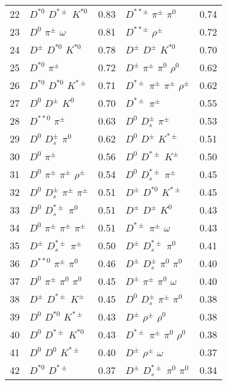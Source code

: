 \documentclass[6pt]{article}
\begin{document}
\begin{tabular}{rlr|lr}
22 & $D^{*0}$ $D^{*\pm}$ $K^{*0}$ & 0.83 & $D^{**\pm}$ $\pi^{\pm}$ $\pi^0$ & 0.74 \\
23 & $D^0$ $\pi^{\pm}$ $\omega$ & 0.81 & $D^{**\pm}$ $\rho^{\pm}$ & 0.72 \\
24 & $D^{\pm}$ $D^{*0}$ $K^{*0}$ & 0.78 & $D^{\pm}$ $D^{\pm}$ $K^{*0}$ & 0.70 \\
25 & $D^{*0}$ $\pi^{\pm}$ & 0.72 & $D^{\pm}$ $\pi^{\pm}$ $\pi^0$ $\rho^0$ & 0.62 \\
26 & $D^{*0}$ $D^{*0}$ $K^{*\pm}$ & 0.71 & $D^{*\pm}$ $\pi^{\pm}$ $\pi^{\pm}$ $\rho^{\pm}$ & 0.62 \\
27 & $D^0$ $D^{\pm}$ $K^0$ & 0.70 & $D^{*\pm}$ $\pi^{\pm}$ & 0.55 \\
28 & $D^{**0}$ $\pi^{\pm}$ & 0.63 & $D^0$ $D_s^{\pm}$ $\pi^{\pm}$ & 0.53 \\
29 & $D^0$ $D_s^{\pm}$ $\pi^0$ & 0.62 & $D^0$ $D^{\pm}$ $K^{*\pm}$ & 0.51 \\
30 & $D^0$ $\pi^{\pm}$ & 0.56 & $D^0$ $D^{*\pm}$ $K^{\pm}$ & 0.50 \\
31 & $D^0$ $\pi^{\pm}$ $\pi^{\pm}$ $\rho^{\pm}$ & 0.54 & $D^0$ $D_s^{*\pm}$ $\pi^{\pm}$ & 0.45 \\
32 & $D^0$ $D_s^{\pm}$ $\pi^{\pm}$ $\pi^{\pm}$ & 0.51 & $D^{\pm}$ $D^{*0}$ $K^{*\pm}$ & 0.45 \\
33 & $D^0$ $D_s^{*\pm}$ $\pi^0$ & 0.51 & $D^{\pm}$ $D^{\pm}$ $K^0$ & 0.43 \\
34 & $D^0$ $\pi^{\pm}$ $\pi^{\pm}$ $\pi^{\pm}$ & 0.51 & $D^{*\pm}$ $\pi^{\pm}$ $\omega$ & 0.43 \\
35 & $D^{\pm}$ $D_s^{*\pm}$ $\pi^{\pm}$ & 0.50 & $D^{\pm}$ $D_s^{*\pm}$ $\pi^0$ & 0.41 \\
36 & $D^{**0}$ $\pi^{\pm}$ $\pi^0$ & 0.46 & $D^{\pm}$ $D_s^{\pm}$ $\pi^0$ $\pi^0$ & 0.40 \\
37 & $D^0$ $\pi^{\pm}$ $\pi^0$ $\pi^0$ & 0.45 & $D^{\pm}$ $\pi^{\pm}$ $\pi^0$ $\omega$ & 0.40 \\
38 & $D^{\pm}$ $D^{*\pm}$ $K^{\pm}$ & 0.45 & $D^0$ $D_s^{\pm}$ $\pi^{\pm}$ $\pi^0$ & 0.38 \\
39 & $D^0$ $D^{*0}$ $K^{*\pm}$ & 0.43 & $D^{\pm}$ $\rho^{\pm}$ $\rho^0$ & 0.38 \\
40 & $D^0$ $D^{*\pm}$ $K^{*0}$ & 0.43 & $D^{*\pm}$ $\pi^{\pm}$ $\pi^0$ $\rho^0$ & 0.38 \\
41 & $D^0$ $D^0$ $K^{*\pm}$ & 0.40 & $D^{\pm}$ $\rho^{\pm}$ $\omega$ & 0.37 \\
42 & $D^{*0}$ $D^{*\pm}$ & 0.37 & $D^{\pm}$ $D_s^{*\pm}$ $\pi^0$ $\pi^0$ & 0.34 \\

\end{tabular}
\end{document}
